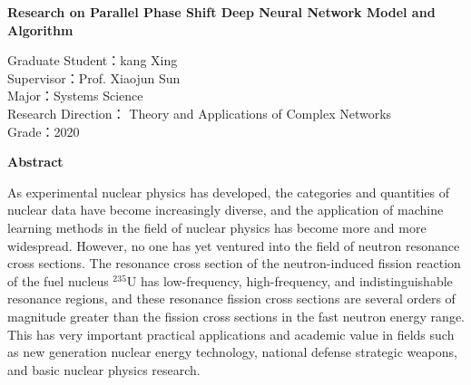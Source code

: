 \begin{center}
\xiaoerhao\bf Research on Parallel Phase Shift Deep Neural Network Model and Algorithm
\end{center}
\vspace{0.7cm}
\begin{flushleft}
	Graduate Student：kang Xing  ~~ \\
	Supervisor：Prof. Xiaojun Sun  ~~~~\\
	Major：Systems Science	~~~~\\
	Research Direction： Theory and Applications of Complex Networks\\%
	Grade：2020\\
\end{flushleft}
\vspace{0.5cm}
\centerline{\bf\sanhao Abstract}
\vspace{0.1cm}
\par
As experimental nuclear physics has developed, the categories and quantities of nuclear data have become increasingly diverse, and the application of machine learning methods in the field of nuclear physics has become more and more widespread. However, no one has yet ventured into the field of neutron resonance cross sections. The resonance cross section of the neutron-induced fission reaction of the fuel nucleus $^{235}$U has low-frequency, high-frequency, and indistinguishable resonance regions, and these resonance fission cross sections are several orders of magnitude greater than the fission cross sections in the fast neutron energy range. This has very important practical applications and academic value in fields such as new generation nuclear energy technology, national defense strategic weapons, and basic nuclear physics research.

